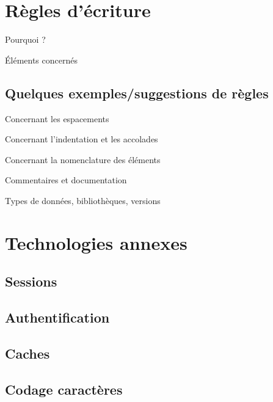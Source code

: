 \documentclass{beamer}
\begin{document}
\section{Règles d’écriture}

\begin{frame}{Pourquoi ?}

\end{frame}

\begin{frame}{Éléments concernés}

\end{frame}

\subsection{Quelques exemples/suggestions de règles}

\begin{frame}{Concernant les espacements}

\end{frame}

\begin{frame}{Concernant l’indentation et les accolades}

\end{frame}

\begin{frame}{Concernant la nomenclature des éléments}

\end{frame}

\begin{frame}{Commentaires et documentation}

\end{frame}

\begin{frame}{Types de données, bibliothèques, versions}

\end{frame}

\section{Technologies annexes}

\subsection{Sessions}

\subsection{Authentification}

\subsection{Caches}

\subsection{Codage caractères}
\end{document}
